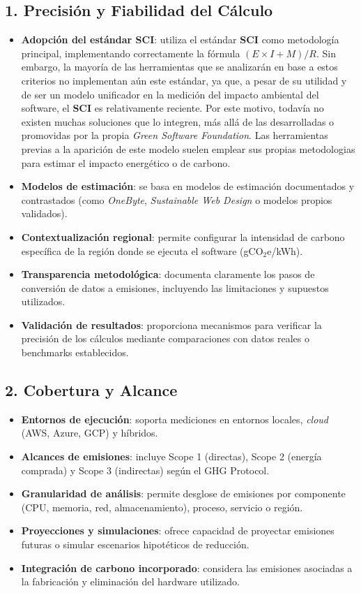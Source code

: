 \documentclass[12pt,a4paper]{report}
\begin{document}
\subsection*{1. Precisión y Fiabilidad del Cálculo}
\begin{itemize}
  \item \textbf{Adopción del estándar SCI}: utiliza el estándar \textbf{SCI} como metodología principal, implementando correctamente la fórmula $(E \times I + M)/R$. Sin embargo, la mayoría de las herramientas que se analizarán en base a estos criterios no implementan aún este estándar, ya que, a pesar de su utilidad y de ser un modelo unificador en la medición del impacto ambiental del software, el \textbf{SCI} es relativamente reciente. Por este motivo, todavía no existen muchas soluciones que lo integren, más allá de las desarrolladas o promovidas por la propia \textit{Green Software Foundation}. Las herramientas previas a la aparición de este modelo suelen emplear sus propias metodologias para estimar el impacto energético o de carbono.
  \item \textbf{Modelos de estimación}: se basa en modelos de estimación documentados y contrastados (como \textit{OneByte}, \textit{Sustainable Web Design} o modelos propios validados).
  \item \textbf{Contextualización regional}: permite configurar la intensidad de carbono específica de la región donde se ejecuta el software (gCO$_2$e/kWh).
  \item \textbf{Transparencia metodológica}: documenta claramente los pasos de conversión de datos a emisiones, incluyendo las limitaciones y supuestos utilizados.
  \item \textbf{Validación de resultados}: proporciona mecanismos para verificar la precisión de los cálculos mediante comparaciones con datos reales o benchmarks establecidos.
\end{itemize}

\subsection*{2. Cobertura y Alcance}
\begin{itemize}
  \item \textbf{Entornos de ejecución}: soporta mediciones en entornos locales, \textit{cloud} (AWS, Azure, GCP) y híbridos.
  \item \textbf{Alcances de emisiones}: incluye Scope 1 (directas), Scope 2 (energía comprada) y Scope 3 (indirectas) según el GHG Protocol.
  \item \textbf{Granularidad de análisis}: permite desglose de emisiones por componente (CPU, memoria, red, almacenamiento), proceso, servicio o región.
  \item \textbf{Proyecciones y simulaciones}: ofrece capacidad de proyectar emisiones futuras o simular escenarios hipotéticos de reducción.
  \item \textbf{Integración de carbono incorporado}: considera las emisiones asociadas a la fabricación y eliminación del hardware utilizado.
\end{itemize}
\end{document}

